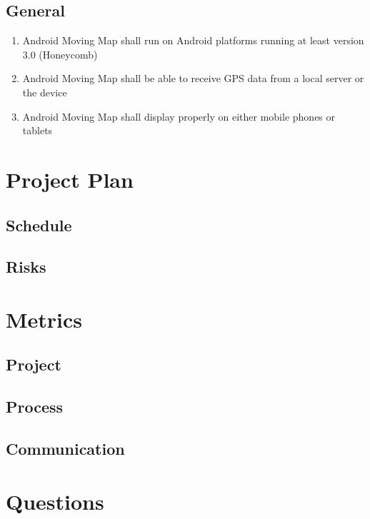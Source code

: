 \documentclass{article}
\begin{document}
\subsection{General}

\begin{enumerate}[label*=4.1.\arabic*]
\item Android Moving Map shall run on Android platforms running at least version 3.0 (Honeycomb)
\item Android Moving Map shall be able to receive GPS data from a local server or the device
\item Android Moving Map shall display properly on either mobile phones or tablets
\end{enumerate}

\section{Project Plan}
\subsection{Schedule}
\subsection{Risks}

\section{Metrics}
\subsection{Project}
\subsection{Process}
\subsection{Communication}

\clearpage

\section{Questions}
\end{document}
